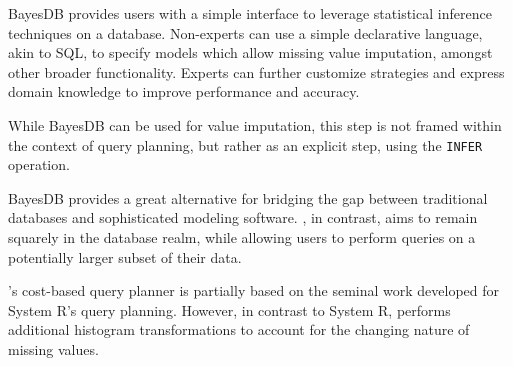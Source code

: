 BayesDB \cite{mansinghka2015bayesdb} provides users with a simple interface to 
leverage statistical inference techniques on a database. Non-experts
can use a simple declarative language, akin to SQL, to specify models
which allow missing value imputation, amongst other broader functionality.
Experts can further customize strategies and express domain knowledge to
improve performance and accuracy.

While BayesDB can be used for value imputation, this step is not framed
within the context of query planning, but rather as an explicit step, using the
\verb|INFER| operation. 

BayesDB provides a great alternative for bridging the gap between
traditional databases and sophisticated modeling software. \ProjectName{}, in
contrast, aims to remain squarely in the database realm, while allowing
users to perform queries on a potentially larger subset of their data.

\ProjectName's cost-based query planner 
is partially based on the seminal work developed for System R's query planning\cite{blasgen1981system}.
However, in contrast to System R, \ProjectName{} performs additional histogram transformations to account
for the changing nature of missing values.






